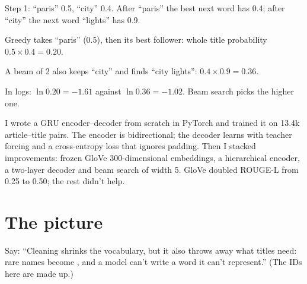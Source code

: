 \begin{example}
Step 1: ``paris'' 0.5, ``city'' 0.4. After ``paris'' the best next word has 0.4; after ``city'' the next word ``lights'' has 0.9.
\begin{steps}
  \item Greedy takes ``paris'' (0.5), then its best follower: whole title probability $0.5 \times 0.4 = 0.20$.
  \item A beam of 2 also keeps ``city'' and finds ``city lights'': $0.4 \times 0.9 = 0.36$.
  \item In logs: $\ln 0.20 = -1.61$ against $\ln 0.36 = -1.02$. Beam search picks the higher one.
\end{steps}
\end{example}

\begin{sayit}
I wrote a GRU encoder--decoder from scratch in PyTorch and trained it on 13.4k article--title pairs. The encoder is bidirectional; the decoder learns with teacher forcing and a cross-entropy loss that ignores padding. Then I stacked improvements: frozen GloVe 300-dimensional embeddings, a hierarchical encoder, a two-layer decoder and beam search of width 5. GloVe doubled ROUGE-L from 0.25 to 0.50; the rest didn't help.
\end{sayit}

\section{The picture}

\begin{sayit}
\begin{pic}
\end{pic}
Say: ``Cleaning shrinks the vocabulary, but it also throws away what titles need: rare names become , and a model can't write a word it can't represent.'' (The IDs here are made up.)
\end{sayit}

